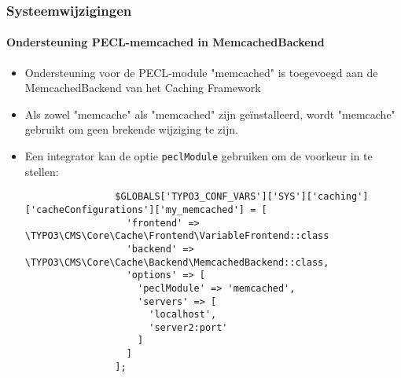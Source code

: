 \begin{frame}[fragile]
	\frametitle{Systeemwijzigingen}
	\framesubtitle{Ondersteuning PECL-memcached in MemcachedBackend}

	\lstset{basicstyle=\tiny\ttfamily}

	\begin{itemize}

		\item Ondersteuning voor de PECL-module "memcached" is toegevoegd aan de
			MemcachedBackend van het Caching Framework

		\item Als zowel "memcache" als "memcached" zijn geïnstalleerd, wordt "memcache"
			gebruikt om geen brekende wijziging te zijn.

		\item Een integrator kan de optie \texttt{peclModule} gebruiken om de voorkeur
			in te stellen:

			\begin{lstlisting}
				$GLOBALS['TYPO3_CONF_VARS']['SYS']['caching']['cacheConfigurations']['my_memcached'] = [
				  'frontend' => \TYPO3\CMS\Core\Cache\Frontend\VariableFrontend::class
				  'backend' => \TYPO3\CMS\Core\Cache\Backend\MemcachedBackend::class,
				  'options' => [
				    'peclModule' => 'memcached',
				    'servers' => [
				      'localhost',
				      'server2:port'
				    ]
				  ]
				];
			\end{lstlisting}

	\end{itemize}

\end{frame}


